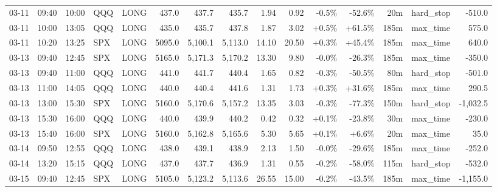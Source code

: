 \documentclass[11pt,a4paper,twoside]{article}
\begin{document}
\begin{landscape}
\begin{center}
\begin{longtable}{>{\color{txtmain}}l l l l l r r r r r r r r >{\color{txtmain}}l r}
03-11 & 09:40 & 10:00 & QQQ & LONG & 437.0 & 437.7 & 435.7 & 1.94 & 0.92 & \textcolor{lossred}{-0.5\%} & \textcolor{lossred}{-52.6\%} & 20m & hard\_stop & \textcolor{lossred}{-510.0} \\
03-11 & 10:00 & 13:05 & QQQ & LONG & 435.0 & 435.7 & 437.8 & 1.87 & 3.02 & \textcolor{wingreen}{+0.5\%} & \textcolor{wingreen}{+61.5\%} & 185m & max\_time & \textcolor{wingreen}{575.0} \\
03-11 & 10:20 & 13:25 & SPX & LONG & 5095.0 & 5,100.1 & 5,113.0 & 14.10 & 20.50 & \textcolor{wingreen}{+0.3\%} & \textcolor{wingreen}{+45.4\%} & 185m & max\_time & \textcolor{wingreen}{640.0} \\
03-13 & 09:40 & 12:45 & SPX & LONG & 5165.0 & 5,171.3 & 5,170.2 & 13.30 & 9.80 & \textcolor{lossred}{-0.0\%} & \textcolor{lossred}{-26.3\%} & 185m & max\_time & \textcolor{lossred}{-350.0} \\
03-13 & 09:40 & 11:00 & QQQ & LONG & 441.0 & 441.7 & 440.4 & 1.65 & 0.82 & \textcolor{lossred}{-0.3\%} & \textcolor{lossred}{-50.5\%} & 80m & hard\_stop & \textcolor{lossred}{-501.0} \\
03-13 & 11:00 & 14:05 & QQQ & LONG & 440.0 & 440.4 & 441.6 & 1.31 & 1.73 & \textcolor{wingreen}{+0.3\%} & \textcolor{wingreen}{+31.6\%} & 185m & max\_time & \textcolor{wingreen}{290.5} \\
03-13 & 13:00 & 15:30 & SPX & LONG & 5160.0 & 5,170.6 & 5,157.2 & 13.35 & 3.03 & \textcolor{lossred}{-0.3\%} & \textcolor{lossred}{-77.3\%} & 150m & hard\_stop & \textcolor{lossred}{-1,032.5} \\
03-13 & 15:30 & 16:00 & QQQ & LONG & 440.0 & 439.9 & 440.2 & 0.42 & 0.32 & \textcolor{wingreen}{+0.1\%} & \textcolor{lossred}{-23.8\%} & 30m & max\_time & \textcolor{lossred}{-230.0} \\
03-13 & 15:40 & 16:00 & SPX & LONG & 5160.0 & 5,162.8 & 5,165.6 & 5.30 & 5.65 & \textcolor{wingreen}{+0.1\%} & \textcolor{wingreen}{+6.6\%} & 20m & max\_time & \textcolor{wingreen}{35.0} \\
03-14 & 09:50 & 12:55 & QQQ & LONG & 438.0 & 439.1 & 438.9 & 2.13 & 1.50 & \textcolor{lossred}{-0.0\%} & \textcolor{lossred}{-29.6\%} & 185m & max\_time & \textcolor{lossred}{-252.0} \\
03-14 & 13:20 & 15:15 & QQQ & LONG & 437.0 & 437.7 & 436.9 & 1.31 & 0.55 & \textcolor{lossred}{-0.2\%} & \textcolor{lossred}{-58.0\%} & 115m & hard\_stop & \textcolor{lossred}{-532.0} \\
03-15 & 09:40 & 12:45 & SPX & LONG & 5105.0 & 5,123.2 & 5,113.6 & 26.55 & 15.00 & \textcolor{lossred}{-0.2\%} & \textcolor{lossred}{-43.5\%} & 185m & max\_time & \textcolor{lossred}{-1,155.0} \\

\end{longtable}
\end{center}
\end{landscape}
\end{document}
